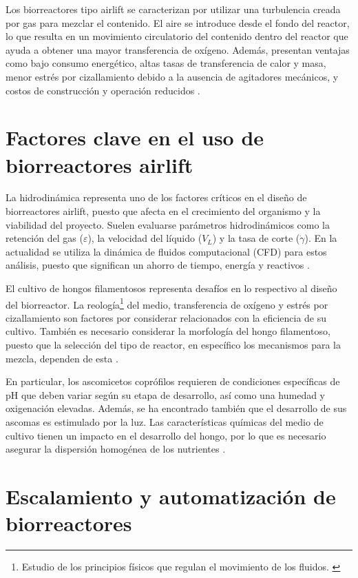 \documentclass[11pt,tesis,twoside,openright,spanish]{upiiztt}
\begin{document}
Los biorreactores tipo airlift se caracterizan por utilizar una
turbulencia creada por gas para mezclar el contenido. El aire se introduce desde el
fondo del reactor, lo que resulta en un movimiento circulatorio del contenido dentro
del reactor que ayuda a obtener una mayor transferencia de oxígeno.
Además, presentan ventajas como bajo consumo energético, altas tasas de
transferencia de calor y masa, menor estrés por cizallamiento debido a la ausencia
de agitadores mecánicos, y costos de construcción y operación reducidos \cite{Esperanca2023}.

\section{Factores clave en el uso de biorreactores airlift}

La hidrodinámica representa uno de los factores críticos en el diseño de
biorreactores airlift, puesto que afecta en el crecimiento del organismo y la viabilidad
del proyecto. Suelen evaluarse parámetros hidrodinámicos como la retención del
gas ($\varepsilon$), la velocidad del líquido ($V_L$) y la tasa de corte ($\dot{\gamma}$). En la actualidad se utiliza
la dinámica de fluidos computacional (CFD) para estos análisis, puesto que
significan un ahorro de tiempo, energía y reactivos \cite{Esperanca2023}.

El cultivo de hongos filamentosos representa desafíos en lo respectivo al diseño del
biorreactor. La reología\footnote{Estudio de los principios físicos que regulan el movimiento de los fluidos. \cite{rae_reologia}} del medio, transferencia de oxígeno y estrés por
cizallamiento son factores por considerar relacionados con la eficiencia de su
cultivo. También es necesario considerar la morfología del hongo filamentoso,
puesto que la selección del tipo de reactor, en específico los mecanismos para la
mezcla, dependen de esta \cite{Gomes2023}.

En particular, los ascomicetos coprófilos requieren de condiciones específicas de
pH que deben variar según su etapa de desarrollo, así como una humedad y
oxigenación elevadas. Además, se ha encontrado también que el desarrollo de sus
ascomas es estimulado por la luz. Las características químicas del medio de cultivo
tienen un impacto en el desarrollo del hongo, por lo que es necesario asegurar la
dispersión homogénea de los nutrientes \cite{Bills2013,Gomes2023}.

\section{Escalamiento y automatización de biorreactores}
\end{document}
